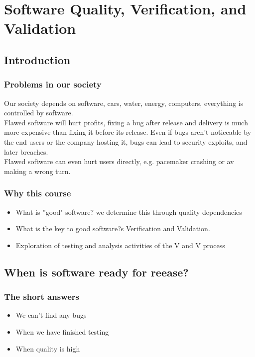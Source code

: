 \chapter{Software Quality, Verification, and Validation}
\section{Introduction}
\subsection{Problems in our society}
Our society depends on software, cars, water, energy, computers, everything is controlled by software.\\
Flawed software will hurt profits, fixing a bug after release and delivery is much more expensive than fixing it before its release. Even if bugs aren't noticeable by the end users or the company hosting it, bugs can lead to security exploits, and later breaches.\\
Flawed software can even hurt users directly, e.g. pacemaker crashing or av making a wrong turn.\\

\subsection{Why this course}
\begin{itemize}
	\item What is ''good" software?
	      \subitem we determine this through quality dependencies
	\item What is the key to good software?s
	      \subitem Verification and Validation.
	\item Exploration of testing and analysis activities of the V and V process
\end{itemize}

\section{When is software ready for reease?}
\subsection{The short answers}
\begin{itemize}
	\item We can't find any bugs
	\item When we have finished testing
	\item When quality is high
\end{itemize}

